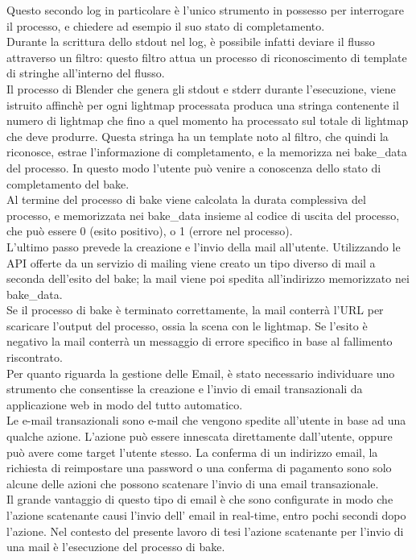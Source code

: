 Questo secondo log in particolare è l’unico strumento in possesso per interrogare il processo, e chiedere ad esempio il suo stato di completamento. 
\\
Durante la scrittura dello stdout nel log, è possibile infatti deviare il flusso attraverso un filtro: questo filtro attua un processo di riconoscimento di template di stringhe all’interno del flusso.
\\ 
Il processo di Blender che genera gli stdout e stderr durante l’esecuzione, viene istruito affinchè per ogni lightmap processata produca una stringa contenente il numero di lightmap che fino a quel momento ha processato sul totale di lightmap che deve produrre. 
Questa stringa ha un template noto al filtro, che quindi la riconosce, estrae l’informazione di completamento, e la memorizza nei bake\_data del processo. In questo modo l’utente può venire a conoscenza dello stato di completamento del bake. 
\\
Al termine del processo di bake viene calcolata la durata complessiva del processo, e memorizzata nei bake\_data insieme al codice di uscita del processo, che può essere 0 (esito positivo), o 1 (errore nel processo).
\\ 
L'ultimo passo prevede la creazione e l'invio della mail all'utente. Utilizzando le API offerte da un servizio di mailing viene creato un tipo diverso di mail a seconda dell’esito del bake; la mail viene poi spedita all’indirizzo memorizzato nei bake\_data. 
\\
Se il processo di bake è terminato correttamente, la mail conterrà l’URL per scaricare l'output del processo, ossia la scena con le lightmap. Se l’esito è negativo la mail conterrà un messaggio di errore specifico in base al fallimento riscontrato.
\\
Per quanto riguarda la gestione delle Email, è stato necessario individuare uno strumento che consentisse la creazione e l’invio di email transazionali da applicazione web in modo del tutto automatico. 
\\
Le e-mail transazionali sono e-mail che vengono spedite all’utente in base ad una qualche azione. L’azione può essere innescata direttamente dall’utente, oppure può avere come target l’utente stesso. La conferma di un indirizzo email, la richiesta di reimpostare una password o una conferma di pagamento sono solo alcune delle azioni che possono scatenare l’invio di una email transazionale. 
\\
Il grande vantaggio di questo tipo di email è che sono configurate in modo che l’azione scatenante causi l’invio dell’ email in real-time, entro pochi secondi dopo l’azione. Nel contesto del presente lavoro di tesi l’azione scatenante per l’invio di una mail è l’esecuzione del processo di bake. 
